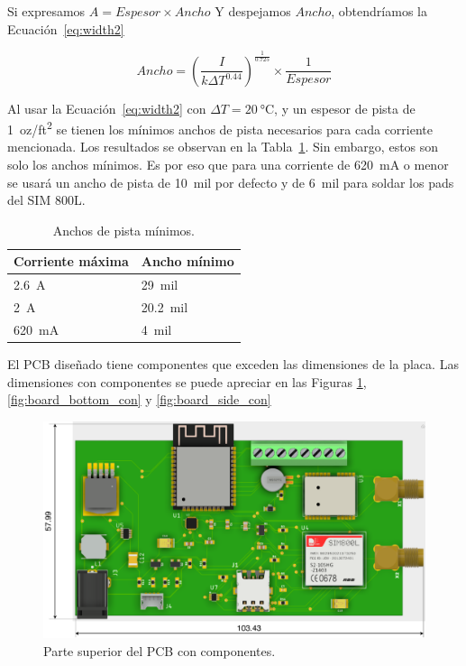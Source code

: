 Si expresamos $A=Espesor\times Ancho$ Y despejamos $Ancho$, obtendríamos la Ecuación~\ref{eq:width2}

\begin{equation}
    Ancho = \left(\frac{I}{k\Delta T^{0.44}}\right)^{\frac{1}{0.725}}\times \frac{1}{Espesor}
    \label{eq:width2}
\end{equation}


Al usar la Ecuación~\ref{eq:width2} con $\Delta T=\SI{20}{\celsius}$, y un espesor de pista de \SI{1}{oz/ft^2} se tienen los mínimos anchos de pista necesarios para cada corriente mencionada. Los resultados se observan en la Tabla~\ref{diag:traces_width}. Sin embargo, estos son solo los anchos mínimos. Es por eso que para una corriente de \SI{620}{mA} o menor se usará un ancho de pista de \SI{10}{mil} por defecto y de \SI{6}{mil} para soldar los pads del SIM 800L.

\bgroup
\def\arraystretch{1.5}%
\begin{table}[htbp!]
\centering
\caption[Anchos de pista mínimos]{Anchos de pista mínimos.}
\begin{tabular}{@{}ll@{}}
\toprule
Corriente máxima & Ancho mínimo \\ \midrule
\SI{2.6}{A} & \SI{29}{mil} \\
\SI{2}{A} & \SI{20.2}{mil} \\
\SI{620}{mA} & \SI{4}{mil} \\ \bottomrule
\end{tabular}
\label{diag:traces_width}
\end{table}
\egroup

El PCB diseñado tiene componentes que exceden las dimensiones de la placa. Las dimensiones con componentes se puede apreciar en las Figuras \ref{fig:board_top_con},  \ref{fig:board_bottom_con} y \ref{fig:board_side_con}

\begin{figure}[hbtp!]
\centering
\includegraphics[width=\textwidth]{board_top_com_dim.pdf}
\caption{Parte superior del PCB con componentes.}
\label{fig:board_top_con}
\end{figure}


